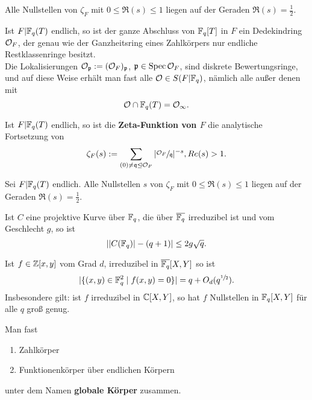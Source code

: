 \begin{vermutung}[Riemannsche Vermutung, Riemann für $F=\Q$]
    Alle Nullstellen von $\zeta_F$ mit $0 \leq \Re(s) \leq 1$ liegen auf der Geraden $\Re(s)=\frac{1}{2}$.
\end{vermutung}

\begin{bemerkungnr}
    Ist $F|\mathbb{F}_q(T)$ endlich, so ist der ganze Abschluss von $\mathbb{F}_q[T]$ in $F$ ein Dedekindring $\mathcal{O}_F$, der genau wie der 
    Ganzheitsring eines Zahlkörpers nur endliche Restklassenringe besitzt.\\
    Die Lokalisierungen $\mathcal{O}_\mathfrak{p} := (\mathcal{O}_F)_\mathfrak{p}$, $\mathfrak{p} \in \operatorname{Spec} \mathcal{O}_F$, sind diskrete Bewertungsringe,
    und auf diese Weise erhält man fast alle $\mathcal{O} \in S(F|\mathbb{F}_q)$, nämlich alle außer denen mit
    $$ \mathcal{O} \cap \mathbb{F}_q(T) = \mathcal{O}_\infty. $$
\end{bemerkungnr}

\begin{definition}
    Ist $F|\mathbb{F}_q(T)$ endlich, so ist die \textbf{Zeta-Funktion von $F$} die analytische Fortsetzung von
    $$ \zeta_F(s) := \sum_{(0) \ne \mathfrak{q}\trianglelefteq \mathcal{O}_F}|\sfrac{\mathcal{O}_F}{\mathfrak{q}}|^{-s}, Re(s) > 1.$$
\end{definition}

\begin{theorem}[Weil 1949]
    Sei $F|\mathbb{F}_q(T)$ endlich. Alle Nullstellen $s$ von $\zeta_F$ mit $0 \leq \Re(s) \leq 1$
    liegen auf der Geraden $\Re(s) = \frac{1}{2}$.
\end{theorem}

\begin{korollar}
    Ist $C$ eine projektive Kurve über $\mathbb{F}_q$, die über $\overline{\mathbb{F}_q}$ irreduzibel ist und vom Geschlecht $g$, so ist
    $$ ||C(\mathbb{F}_q)|-(q+1)| \leq 2 g \sqrt{q}.$$
\end{korollar}

\begin{korollar}
    Ist $f \in \mathbb{Z}[x,y]$ vom Grad $d$, irreduzibel in $\overline{\mathbb{F}_q}[X,Y]$ so ist
    $$ |\{(x,y) \in \mathbb{F}_q^2 \mid f(x,y)=0\}| = q + O_d(q^{\sfrac{1}{2}}).$$
    Insbesondere gilt: ist $f$ irreduzibel in $\mathbb{C}[X,Y]$, so hat $f$ Nullstellen in $\mathbb{F}_q[X,Y]$ für alle $q$ 
    groß genug.
\end{korollar}

\begin{bemerkungnr}
    Man fast
    \begin{enumerate}[label=(\alph*)]
        \item Zahlkörper
        \item Funktionenkörper über endlichen Körpern
    \end{enumerate}
    unter dem Namen \textbf{globale Körper} zusammen.
\end{bemerkungnr}
